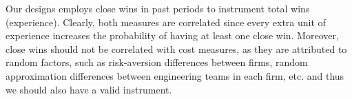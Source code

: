\begin{table}[!h]
\caption{Robustness checks for the duration of outcomes' computation period}
\centering
{}
\end{table}

Our designs employs close wins in past periods to instrument total wins (experience). Clearly, both measures are correlated since every extra unit of experience increases the probability of having at least one close win. Moreover, close wins should not be correlated with cost measures, as they are attributed to random factors, such as risk-aversion differences between firms, random approximation differences between engineering teams in each firm, etc. and thus we should also have a valid instrument.


